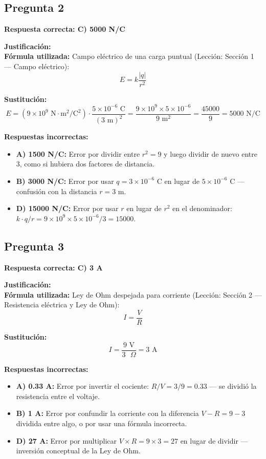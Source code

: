 \begin{respuestabox}
\subsection{Pregunta 2}
\textcolor{verdecorrecto}{\textbf{Respuesta correcta: C) 5000 N/C}}

\textbf{Justificación:}\\
\textbf{Fórmula utilizada:} Campo eléctrico de una carga puntual (Lección: Sección 1 — Campo eléctrico):
$$E = k \frac{|q|}{r^2}$$

\textbf{Sustitución:}
$$E = (9 \times 10^9 \text{ N}\cdot\text{m}^2/\text{C}^2) \cdot \frac{5 \times 10^{-6} \text{ C}}{(3 \text{ m})^2} = \frac{9 \times 10^9 \times 5 \times 10^{-6}}{9 \text{ m}^2} = \frac{45000}{9} = 5000 \text{ N/C}$$

\textbf{Respuestas incorrectas:}
\begin{itemize}
    \item \textbf{A) 1500 N/C:} Error por dividir entre $r^2 = 9$ y luego dividir de nuevo entre 3, como si hubiera dos factores de distancia.
    \item \textbf{B) 3000 N/C:} Error por usar $q = 3 \times 10^{-6}$ C en lugar de $5 \times 10^{-6}$ C — confusión con la distancia $r = 3$ m.
    \item \textbf{D) 15000 N/C:} Error por usar $r$ en lugar de $r^2$ en el denominador: $k \cdot q / r = 9\times10^9 \times 5\times10^{-6} / 3 = 15000$.
\end{itemize}
\end{respuestabox}

\begin{respuestabox}
\subsection{Pregunta 3}
\textcolor{verdecorrecto}{\textbf{Respuesta correcta: C) 3 A}}

\textbf{Justificación:}\\
\textbf{Fórmula utilizada:} Ley de Ohm despejada para corriente (Lección: Sección 2 — Resistencia eléctrica y Ley de Ohm):
$$I = \frac{V}{R}$$

\textbf{Sustitución:}
$$I = \frac{9 \text{ V}}{3 \text{ }\Omega} = 3 \text{ A}$$

\textbf{Respuestas incorrectas:}
\begin{itemize}
    \item \textbf{A) 0.33 A:} Error por invertir el cociente: $R/V = 3/9 = 0.33$ — se dividió la resistencia entre el voltaje.
    \item \textbf{B) 1 A:} Error por confundir la corriente con la diferencia $V - R = 9 - 3$ dividida entre algo, o por usar una fórmula incorrecta.
    \item \textbf{D) 27 A:} Error por multiplicar $V \times R = 9 \times 3 = 27$ en lugar de dividir — inversión conceptual de la Ley de Ohm.
\end{itemize}
\end{respuestabox}

